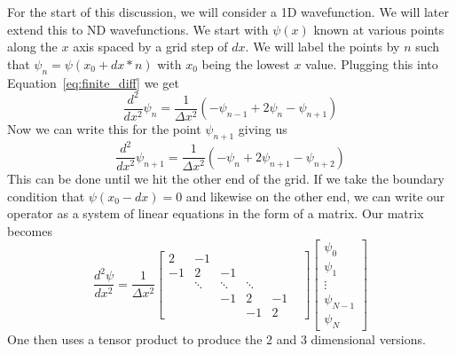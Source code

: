 \documentclass{article}
\begin{document}
For the start of this discussion, we will consider a 1D wavefunction. We will later extend this to ND wavefunctions. We start with $\psi(x)$ known at various points along the $x$ axis spaced by a grid step of $dx$. We will label the points by $n$ such that $\psi_n = \psi(x_0 + dx*n)$ with $x_0$ being the lowest $x$ value. Plugging this into Equation~\ref{eq:finite_diff} we get
\begin{equation}
    \frac{d^2}{dx^2}\psi_n = \frac{1}{\Delta x^2}\left(-\psi_{n-1}+2\psi_n-\psi_{n+1} \right)
    \label{eq:finite_diff_second_order}
\end{equation}
Now we can write this for the point $\psi_{n+1}$ giving us
\begin{equation}
    \frac{d^2}{dx^2}\psi_{n+1} = \frac{1}{\Delta x^2}\left(-\psi_{n}+2\psi_{n+1}-\psi_{n+2} \right)
    \label{eq:finite_diff_second_order_n+1}
\end{equation}
This can be done until we hit the other end of the grid. If we take the boundary condition that $\psi(x_0-dx)=0$ and likewise on the other end, we can write our operator as a system of linear equations in the form of a matrix. Our matrix becomes
\begin{equation}
\frac{d^2\psi}{dx^2} =
\frac{1}{\Delta x^2}
\begin{bmatrix}
    2 & -1 &  &  &   &  \\
    -1 & 2 & -1 &  &  &  \\
     & \ddots & \ddots & \ddots & \\
     &  & -1 & 2 & -1\\
     &   &  & -1 & 2
\end{bmatrix}
\begin{bmatrix}
    \psi_{0} \\
    \psi_{1} \\
    \vdots  \\
    \psi_{N-1}  \\
    \psi_{N}
\end{bmatrix}
\end{equation}
One then uses a tensor product to produce the 2 and 3 dimensional versions.
\end{document}
